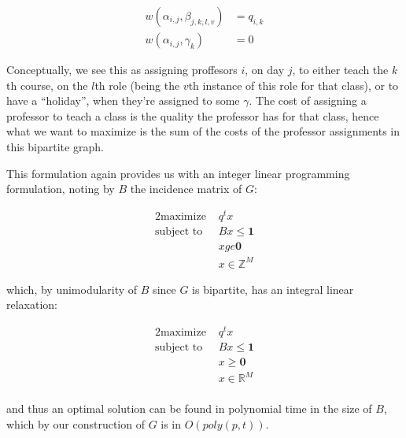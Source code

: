 \begin{align*}
  w(\alpha_{i, j}, \beta_{j, k, l, v}) &= q_{i, k}\\
  w(\alpha_{i, j}, \gamma_k) &= 0
\end{align*}

Conceptually, we see this as assigning proffesors $i$, on day $j$, to either teach the $k$th course, on the $l$th role (being the $v$th instance of this role for that class), or to have a ``holiday'', when they're assigned to some $\gamma$. The cost of assigning a professor to teach a class is the quality the professor has for that class, hence what we want to maximize is the sum of the costs of the professor assignments in this bipartite graph.

This formulation again provides us with an integer linear programming formulation, noting by $B$ the incidence matrix of $G$:

\begin{alignat*}{2}
  \text{maximize }   & q^t x \\
  \text{subject to } & Bx \le \mathbf{1}\\
                     & x ge \mathbf{0}\\
                     & x \in \mathbb{Z}^M
\end{alignat*}

which, by unimodularity of $B$ since $G$ is bipartite,  has an integral linear relaxation:

\begin{alignat*}{2}
  \text{maximize }   & q^t x \\
  \text{subject to } & Bx \le \mathbf{1}\\
                     & x \ge \mathbf{0}\\
                     & x \in \mathbb{R}^M\\
\end{alignat*}

and thus an optimal solution can be found in polynomial time in the size of $B$, which by our construction of $G$ is in $O(poly(p, t))$.
